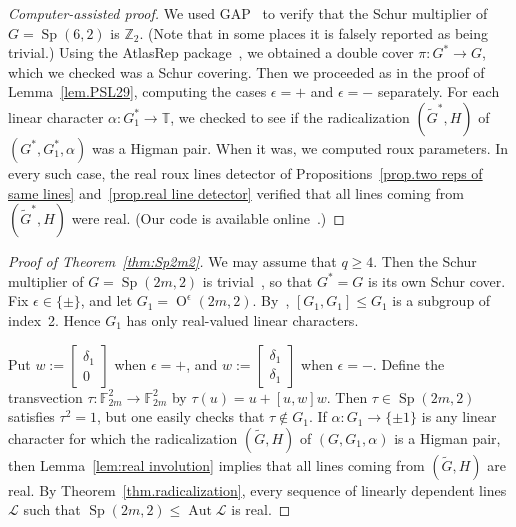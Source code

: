 \documentclass[11pt]{article}
\theoremstyle{definition}
\numberwithin{equation}{section}
\begin{document}
\begin{proof}[Computer-assisted proof]
We used GAP~\cite{GAP} to verify that the Schur multiplier of $G=\operatorname{Sp}(6,2)$ is $\mathbb{Z}_2$.
(Note that in some places it is falsely reported as being trivial.)
Using the AtlasRep package~\cite{AtlasRep}, we obtained a double cover $\pi \colon G^* \to G$, which we checked was a Schur covering.
Then we proceeded as in the proof of Lemma~\ref{lem.PSL29}, computing the cases $\epsilon = +$ and $\epsilon = -$ separately.
For each linear character $\alpha \colon G_1^* \to \mathbb{T}$, we checked to see if the radicalization $(\widetilde{G}^*,H)$ of $(G^*,G_1^*,\alpha)$ was a Higman pair.
When it was, we computed roux parameters.
In every such case, the real roux lines detector of Propositions~\ref{prop.two reps of same lines} and~\ref{prop.real line detector} verified that all lines coming from $(\widetilde{G}^*,H)$ were real.
(Our code is available online~\cite{github}.)
\end{proof}

\begin{proof}[Proof of Theorem~\ref{thm:Sp2m2}]
We may assume that $q \geq 4$.
Then the Schur multiplier of $G = \operatorname{Sp}(2m,2)$ is trivial~\cite{Steinberg:62}, so that $G^*=G$ is its own Schur cover.
Fix $\epsilon \in \{ \pm \}$, and let $G_1 = \operatorname{O}^\epsilon(2m,2)$.
By~\cite[Proposition~14.23]{Grove:02}, $[G_1,G_1] \leq G_1$ is a subgroup of index~2.
Hence $G_1$ has only real-valued linear characters.

Put $w := \left[ \begin{array}{c} \delta_1 \\ 0 \end{array} \right]$ when $\epsilon = +$, and $w := \left[ \begin{array}{c} \delta_1 \\ \delta_1 \end{array} \right]$ when $\epsilon = -$.
Define the transvection $\tau \colon \mathbb{F}_{2m}^2 \to \mathbb{F}_{2m}^2$ by $\tau(u) = u + [u,w] w$.
Then $\tau \in \operatorname{Sp}(2m,2)$ satisfies $\tau^2 = 1$, but one easily checks that $\tau \notin G_1$.
If $\alpha \colon G_1 \to \{ \pm 1 \}$ is any linear character for which the radicalization $(\widetilde{G},H)$ of $(G,G_1,\alpha)$ is a Higman pair, then Lemma~\ref{lem:real involution} implies that all lines coming from $(\widetilde{G},H)$ are real.
By Theorem~\ref{thm.radicalization}, every sequence of linearly dependent lines $\mathscr{L}$ such that $\operatorname{Sp}(2m,2) \leq \operatorname{Aut} \mathscr{L}$ is real.
\end{proof}
\end{document}
